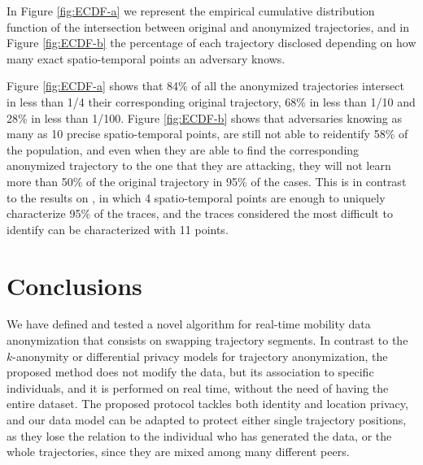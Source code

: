 \documentclass[]{llncs}
\begin{document}
In Figure \ref{fig:ECDF-a} we represent the empirical cumulative distribution function of the intersection between original and anonymized trajectories, and in Figure \ref{fig:ECDF-b} the percentage of each trajectory disclosed depending on how many exact spatio-temporal points an adversary knows.

Figure \ref{fig:ECDF-a} shows that 
84\% of all the anonymized trajectories intersect in less than 1/4 their corresponding original trajectory, 68\% in less than 1/10 and 28\% in less than 1/100.
Figure \ref{fig:ECDF-b} shows that adversaries knowing as many as 10 precise spatio-temporal points, are still not able to reidentify 58\% of the population, and even when they are able to find the corresponding anonymized trajectory to the one that they are attacking, they will not learn more than 50\% of the original trajectory in 95\% of the cases.
This is in contrast to the results on \cite{demontjoye2013}, in which 4 spatio-temporal points are enough to uniquely characterize 95\% of the traces, and the traces considered the most difficult to identify can be characterized with 11 points.

\section{Conclusions}

We have defined and tested a novel algorithm for real-time mobility data \linebreak
anonymization that consists on swapping trajectory segments. In contrast to the $k$-anonymity or differential privacy models for trajectory anonymization, the proposed method does not modify the data, but its association to specific individuals, and it is performed on real time, without the need of having the entire dataset.
The proposed protocol tackles both identity and location privacy, 
 and our data model can be adapted to protect either single trajectory positions, as they lose the relation to the individual who has generated the data, or the whole trajectories, since they are mixed among many different peers.
\end{document}
